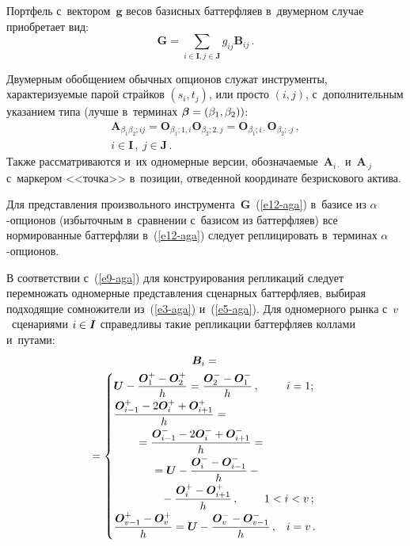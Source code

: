 \begin{multicols}{2}
  Портфель с~вектором~$\bm{g}$ весов базисных баттерфляев в~двумерном 
случае приобретает вид: 
  \begin{equation}
  \bm{G}= \sum\limits_{i\in \bm{I}, j\in \bm{J}} g_{ij} \bm{B}_{ij}\,.
  \label{e12-aga}
  \end{equation}
  
  Двумерным обобщением обычных опционов служат инструменты, 
характеризуемые парой страйков $(s_i,t_j)$, или просто $(i,j)$, 
с~дополнительным указанием типа (лучше в~терминах $\bm{\beta}\hm=(\beta_1, 
\beta_2))$: 
\begin{multline*}
\bm{A}_{\beta_1\beta_2;ij} 
=\bm{O}_{\beta_1;1,i}\bm{O}_{\beta_2;2,j}=\bm{O}_{\beta_1;i\cdot} 
\bm{O}_{\beta_2;\cdot j}\,,\\ 
i\in \bm{I}\,,\ j\in \bm{J}\,.
\end{multline*}
  Также рассматриваются и~их одномерные версии, обозначаемые~$\bm{A}_{i\cdot}$ 
и~$\bm{A}_{\cdot j}$ с~маркером <<точка>> в~позиции, отведенной координате 
безрискового актива. 
  
  Для представления произвольного инструмента~$\bm{G}$~(\ref{e12-aga}) 
в~базисе из $\alpha$-оп\-ци\-онов (избыточным в~сравнении с~базисом из 
баттерфляев) все нормированные баттерфляи в~(\ref{e12-aga}) следует 
реплицировать в~терминах $\alpha$-оп\-ци\-онов. 
  
  В соответствии с~(\ref{e9-aga}) для конструирования репликаций следует 
перемножать одномерные представления сценарных баттерфляев, выбирая 
подходящие сомножители из~(\ref{e3-aga}) и~(\ref{e5-aga}). Для одномерного 
рынка с~$v$~сценариями $i\hm\in \bm{I}$ справедливы такие репликации 
баттерфляев коллами и~путами:
  \begin{multline}
  \bm{B}_i={}\\
  \!\!\!\!{}=\begin{cases}
  \bm{U}-\fr{\bm{O}_1^+ -\bm{O}_2^+}{h}=\fr{\bm{O}_2^- -\bm{O}_1^-}{h}\,, & i=1;\\
  \fr{\bm{O}_{i-1}^+-2\bm{O}_i^+ +\bm{O}_{i+1}^+}{h}={}&\\
  \hspace*{7mm}{}= \fr{\bm{O}^-_{i-1}-2\bm{O}_i^- +\bm{O}^-_{i+1}}{h}={}&\\
  \hspace*{12mm}{}= \bm{U}-\fr{\bm{O}_i^- -\bm{O}^-_{i-1}}{h} -{}&\\
  \hspace*{15mm}{}- \fr{\bm{O}_i^+  - \bm{O}^+_{i+1}}{h}\,, &\hspace*{-7mm} 1<i<v\,;\\
  \fr{\bm{O}^+_{v-1} -\bm{O}_v^+}{h}=\bm{U}-\fr{\bm{O}_v^- -\bm{O}^-_{v-
1}}{h}\,, & i=v\,.
  \end{cases}\!
  \label{e13-aga}
  \end{multline}
  

\end{multicols}
